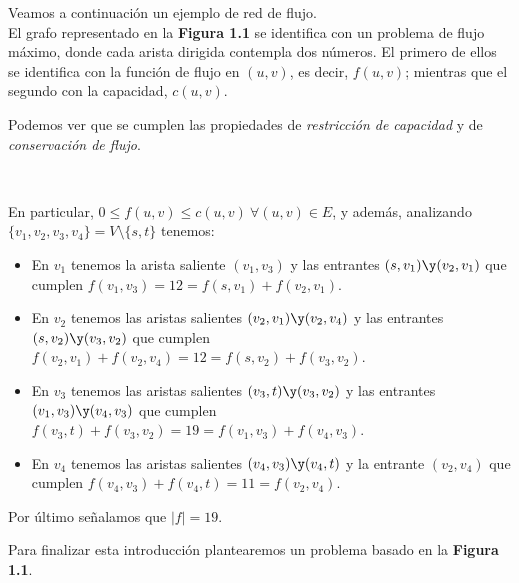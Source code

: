 \begin{ejem} Veamos a continuación un ejemplo de red de flujo.\\
El grafo representado en la \textbf{Figura 1.1} se identifica con un problema de flujo máximo, donde cada arista dirigida contempla dos números. El primero de ellos se identifica con la función de flujo en $(u,v)$, es decir, $f(u,v)$; mientras que el segundo con la capacidad, $c(u,v)$.

Podemos ver que se cumplen las propiedades de \textit{restricción de capacidad} y de \textit{conservación de flujo}.
\begin{figura}\ \begin{center}\end{center}\end{figura}

En particular, $0\leq f(u,v)\leq c(u,v)\ \forall (u,v)\in E$, y además, analizando\\
$\{v_1,v_2,v_3,v_4\}=V\setminus \{s,t\}$ tenemos:
\begin{itemize}
\item En $v_1$ tenemos la arista saliente $(v_1,v_3)$ y las entrantes $(s,v_1)\y(v_2,v_1)$ que cumplen $f(v_1,v_3)=12 = f(s,v_1)+f(v_2,v_1)$.
\item En $v_2$ tenemos las aristas salientes $(v_2,v_1)\y(v_2,v_4)$ y las entrantes $(s,v_2)\y(v_3,v_2)$ que cumplen
$f(v_2,v_1)+f(v_2,v_4)=12=f(s,v_2)+f(v_3,v_2)$.
\item En $v_3$ tenemos las aristas salientes $(v_3,t)\y(v_3,v_2)$ y las entrantes $(v_1,v_3)\y(v_4,v_3)$ que cumplen
$f(v_3,t)+f(v_3,v_2)=19=f(v_1,v_3)+f(v_4,v_3)$.
\item En $v_4$ tenemos las aristas salientes $(v_4,v_3)\y(v_4,t)$ y la entrante $(v_2,v_4)$ que cumplen
$f(v_4,v_3)+f(v_4,t)=11=f(v_2,v_4)$.
\end{itemize}
Por último señalamos que $|f| = 19$.
\end{ejem}

Para finalizar esta introducción plantearemos un problema basado en la \textbf{Figura 1.1}.\\

